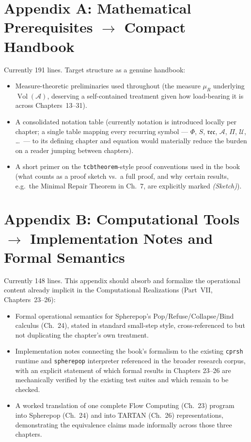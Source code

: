 \documentclass[11pt]{report}
\newcommand{\adm}{\mathcal{A}}
\newcommand{\reco}{\mathfrak{rec}}
\newcommand{\Vol}{\operatorname{Vol}}
\begin{document}
\section{Appendix A: Mathematical Prerequisites \texorpdfstring{$\to$}{->} Compact Handbook}

Currently 191 lines. Target structure as a genuine handbook:

\begin{itemize}
\item Measure-theoretic preliminaries used throughout (the
  measure $\mu_R$ underlying $\Vol(\adm)$, deserving a
  self-contained treatment given how load-bearing it is across
  Chapters~13--31).
\item A consolidated notation table (currently notation is
  introduced locally per chapter; a single table mapping every
  recurring symbol --- $\Phi$, $S$, $\reco$, $\adm$, $\Pi$,
  $\mathcal{U}$, \ldots\ --- to its defining chapter and
  equation would materially reduce the burden on a reader
  jumping between chapters).
\item A short primer on the \texttt{tcbtheorem}-style proof
  conventions used in the book (what counts as a proof sketch
  vs.\ a full proof, and why certain results, e.g.\ the Minimal
  Repair Theorem in Ch.~7, are explicitly marked
  \textit{(Sketch)}).
\end{itemize}

\section{Appendix B: Computational Tools \texorpdfstring{$\to$}{->} Implementation Notes and Formal Semantics}

Currently 148 lines. This appendix should absorb and formalize
the operational content already implicit in the Computational
Realizations (Part~VII, Chapters~23--26):

\begin{itemize}
\item Formal operational semantics for Spherepop's
  Pop/Refuse/Collapse/Bind calculus (Ch.~24), stated in
  standard small-step style, cross-referenced to but not
  duplicating the chapter's own treatment.
\item Implementation notes connecting the book's formalism to
  the existing \texttt{cprsh} runtime and \texttt{spherepop}
  interpreter referenced in the broader research corpus, with
  an explicit statement of which formal results in Chapters
  23--26 are mechanically verified by the existing test suites
  and which remain to be checked.
\item A worked translation of one complete Flow Computing
  (Ch.~23) program into Spherepop (Ch.~24) and into TARTAN
  (Ch.~26) representations, demonstrating the equivalence
  claims made informally across those three chapters.
\end{itemize}
\end{document}
